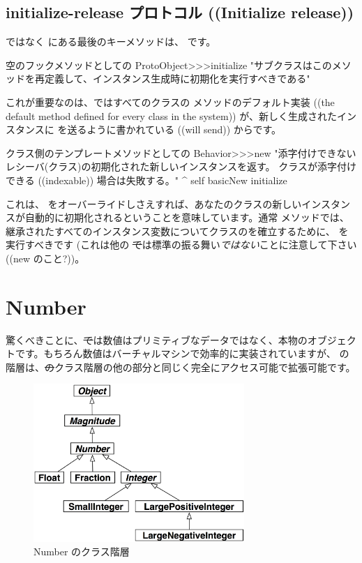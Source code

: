 \documentclass[a4paper,10pt,twoside]{book}
\begin{document}
\subsection{initialize-release プロトコル ((Initialize release))}

 ではなく  にある最後のキーメソッドは、 です。

\begin{method}{空のフックメソッドとしての }
ProtoObject>>>initialize
   "サブクラスはこのメソッドを再定義して、インスタンス生成時に初期化を実行すべきである"
\end{method}

これが重要なのは、\pharo ではすべてのクラスの  メソッドのデフォルト実装 ((the default  method defined for every class in the system)) が、新しく生成されたインスタンスに  を送るように書かれている ((will send)) からです。

\begin{method}{クラス側のテンプレートメソッドとしての }
Behavior>>>new
    "添字付けできないレシーバ(クラス)の初期化された新しいインスタンスを返す。
    クラスが添字付けできる ((indexable)) 場合は失敗する。"
    ^ self basicNew initialize
\end{method}

これは、 をオーバーライドしさえすれば、あなたのクラスの新しいインスタンスが自動的に初期化されるということを意味しています。通常  メソッドでは、継承されたすべてのインスタンス変数についてクラスのを確立するために、 を実行すべきです
(これは他の \st では標準の振る舞い\emph{ではない}ことに注意して下さい ((new のこと?))。

\section{Number}
驚くべきことに、\st では数値はプリミティブなデータではなく、本物のオブジェクトです。もちろん数値はバーチャルマシンで効率的に実装されていますが、 の階層は、\st のクラス階層の他の部分と同じく完全にアクセス可能で拡張可能です。

\begin{figure}[ht]
\centerline {\includegraphics[width=8cm]{NumberHierarchy}}
\caption{Number のクラス階層 }
\end{figure}
\end{document}

